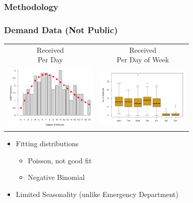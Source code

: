
\begin{frame}
\frametitle{Methodology}

\end{frame}

\begin{frame}
\frametitle{Demand Data (Not Public)}
\begin{tabular}{cc}
\shortstack{Received\\Per Day}&
\shortstack{Received\\Per Day of Week}\\
\includegraphics[width=4.5cm]{imagesoutpatient/referralsperday} &
\includegraphics[width=4.5cm]{imagesoutpatient/referralsdayofweek}
\end{tabular}

{\small
\begin{itemize}
\item Fitting distributions
\begin{itemize}
\item Poisson, not good fit
\item Negative Binomial
\end{itemize}
\item Limited Seasonality (unlike Emergency Department)
\end{itemize}
}
\end{frame}

